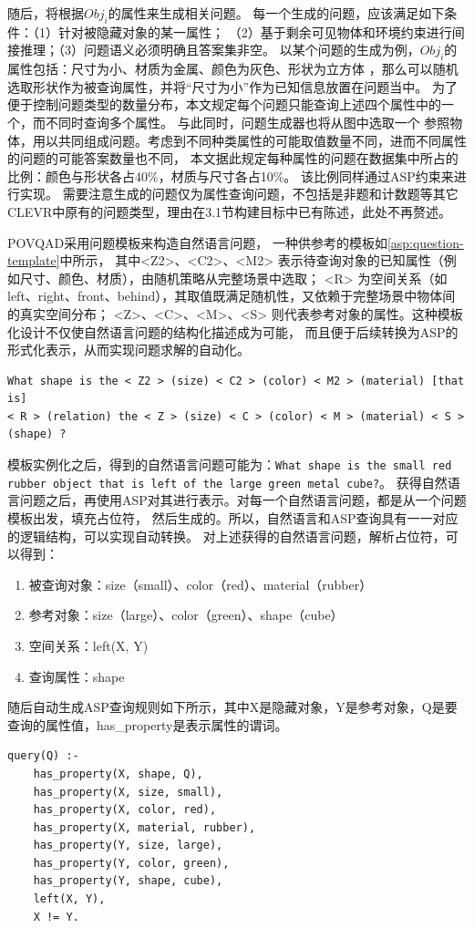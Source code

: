 随后，将根据$Obj_i$的属性来生成相关问题。
每一个生成的问题，应该满足如下条件：（1）针对被隐藏对象的某一属性；
（2）基于剩余可见物体和环境约束进行间接推理；（3）问题语义必须明确且答案集非空。
以某个问题的生成为例，$Obj_i$的属性包括：尺寸为小、材质为金属、颜色为灰色、形状为立方体
，那么可以随机选取形状作为被查询属性，并将“尺寸为小”作为已知信息放置在问题当中。
为了便于控制问题类型的数量分布，本文规定每个问题只能查询上述四个属性中的一个，而不同时查询多个属性。
与此同时，问题生成器也将从图中选取一个
参照物体，用以共同组成问题。考虑到不同种类属性的可能取值数量不同，进而不同属性的问题的可能答案数量也不同，
本文据此规定每种属性的问题在数据集中所占的比例：颜色与形状各占40\%，材质与尺寸各占10\%。
该比例同样通过ASP约束来进行实现。
需要注意生成的问题仅为属性查询问题，不包括是非题和计数题等其它CLEVR中原有的问题类型，理由在3.1节构建目标中已有陈述，此处不再赘述。

POVQAD采用问题模板来构造自然语言问题，
一种供参考的模板如\ref{asp:question-template}中所示，
其中<Z2>、<C2>、<M2> 表示待查询对象的已知属性（例如尺寸、颜色、材质），由随机策略从完整场景中选取；
<R> 为空间关系（如left、right、front、behind），其取值既满足随机性，又依赖于完整场景中物体间的真实空间分布；
<Z>、<C>、<M>、<S> 则代表参考对象的属性。这种模板化设计不仅使自然语言问题的结构化描述成为可能，
而且便于后续转换为ASP的形式化表示，从而实现问题求解的自动化。
\begin{lstlisting}[label=asp:question-template]
What shape is the < Z2 > (size) < C2 > (color) < M2 > (material) [that is] 
< R > (relation) the < Z > (size) < C > (color) < M > (material) < S > (shape) ?
\end{lstlisting}

模板实例化之后，得到的自然语言问题可能为：\texttt{What shape is the small red rubber object that is left of the large green metal cube?}。
获得自然语言问题之后，再使用ASP对其进行表示。对每一个自然语言问题，都是从一个问题模板出发，填充占位符，
然后生成的。所以，自然语言和ASP查询具有一一对应的逻辑结构，可以实现自动转换。
对上述获得的自然语言问题，解析占位符，可以得到：
\begin{enumerate}[nosep]
\item 被查询对象：size（small）、color（red）、material（rubber）
\item 参考对象：size（large）、color（green）、shape（cube）
\item 空间关系：left(X, Y)
\item 查询属性：shape
\end{enumerate}

随后自动生成ASP查询规则如下所示，其中X是隐藏对象，Y是参考对象，Q是要查询的属性值，has\_property是表示属性的谓词。
\begin{lstlisting}
query(Q) :-
    has_property(X, shape, Q),
    has_property(X, size, small),
    has_property(X, color, red),
    has_property(X, material, rubber),
    has_property(Y, size, large),
    has_property(Y, color, green),
    has_property(Y, shape, cube),
    left(X, Y),
    X != Y.
\end{lstlisting}
